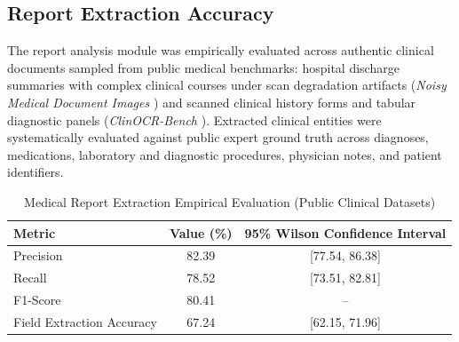 
\subsection{Report Extraction Accuracy}

The report analysis module was empirically evaluated across authentic clinical documents sampled from public medical benchmarks: hospital discharge summaries with complex clinical courses under scan degradation artifacts (\textit{Noisy Medical Document Images} \cite{noisy_med_docs}) and scanned clinical history forms and tabular diagnostic panels (\textit{ClinOCR-Bench} \cite{clinocr_bench}). Extracted clinical entities were systematically evaluated against public expert ground truth across diagnoses, medications, laboratory and diagnostic procedures, physician notes, and patient identifiers.

\begin{table}[ht]
\centering
\caption{Medical Report Extraction Empirical Evaluation (Public Clinical Datasets)}
\label{tab:report_results}
\begin{tabular}{|l|c|c|}
\hline
\textbf{Metric} & \textbf{Value (\%)} & \textbf{95\% Wilson Confidence Interval} \\
\hline
Precision & 82.39 & [77.54, 86.38] \\
Recall & 78.52 & [73.51, 82.81] \\
F1-Score & 80.41 & -- \\
Field Extraction Accuracy & 67.24 & [62.15, 71.96] \\
\hline
\end{tabular}
\end{table}

